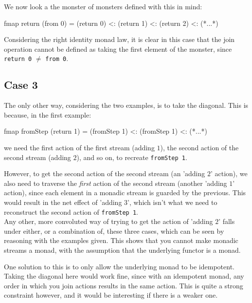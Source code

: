 We now look a the monster of monsters defined with this in mind:
\begin{haskell}
fmap return (from 0) = (return 0) <: (return 1) <: (return 2) <: (*...*)
\end{haskell}

Considering the right identity monad law, it is clear in this case that the join operation cannot be defined as taking the first element of the monster, since \verb+return 0+ $\neq$ \verb+from 0+.

\subsection{Case 3}

The only other way, considering the two examples, is to take the diagonal. This is because, in the first example:
\begin{haskell}
fmap fromStep (return 1) = (fromStep 1) <: (fromStep 1) <: (*...*)
\end{haskell}
we need the first action of the first stream (adding $1$), the second action of the second stream (adding $2$), and so on, to recreate  \verb+fromStep 1+.

However, to get the second action of the second stream (an 'adding $2$' action), we also need to traverse the \emph {first} action of the second stream (another 'adding $1$' action), since each element in a monadic stream is guarded by the previous. This would result in the net effect of 'adding $3$', which isn't what we need to reconstruct the second action of \verb+fromStep 1+. \\

Any other, more convoluted way of trying to get the action of 'adding $2$' falls under either, or a combination of, these three cases, which can be seen by reasoning with the examples given. This shows that you cannot make monadic streams a monad, with the assumption that the underlying functor is a monad.

One solution to this is to only allow the underlying monad to be idempotent. Taking the diagonal here would work fine, since with an idempotent monad, any order in which you join actions results in the same action. This is quite a strong constraint however, and it would be interesting if there is a weaker one.

